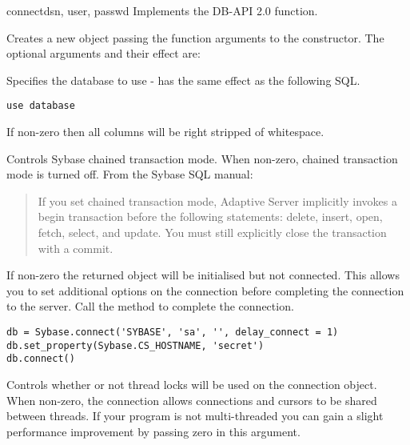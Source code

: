 \begin{funcdesc}{connect}{dsn, user, passwd \optional{, \ldots}}
Implements the DB-API 2.0  function.

Creates a new  object passing the function arguments
to the  constructor.  The
optional arguments and their effect are:

\begin{description}
\item{}

Specifies the database to use - has the same effect as the following
SQL.

\begin{verbatim}
use database
\end{verbatim}

\item{}

If non-zero then all  columns will be right stripped of
whitespace.

\item{}

Controls Sybase chained transaction mode.  When non-zero, chained
transaction mode is turned off.  From the Sybase SQL manual:

\begin{quote}
If you set chained transaction mode, Adaptive Server implicitly
invokes a begin transaction before the following statements: delete,
insert, open, fetch, select, and update. You must still explicitly
close the transaction with a commit.
\end{quote}

%

\item{}

If non-zero the returned  object will be initialised
but not connected.  This allows you to set additional options on the
connection before completing the connection to the server.  Call the
 method to complete the connection.

\begin{verbatim}
db = Sybase.connect('SYBASE', 'sa', '', delay_connect = 1)
db.set_property(Sybase.CS_HOSTNAME, 'secret')
db.connect()
\end{verbatim}

\item{}

Controls whether or not thread locks will be used on the connection
object.  When non-zero, the connection allows connections and cursors to be shared between threads.  If your program is not multi-threaded you can gain a slight performance improvement by passing zero in this argument.
\end{description}
\end{funcdesc}

